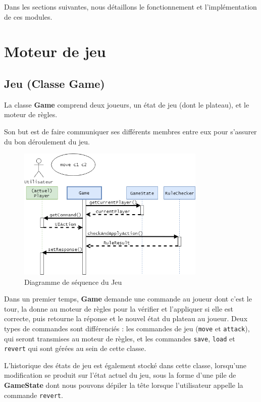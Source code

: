 \documentclass[a4paper]{report}
\begin{document}
Dans les sections suivantes, nous détaillons le fonctionnement et l'implémentation de ces modules.	

\section{Moteur de jeu}

\subsection{Jeu (Classe Game)}

La classe \textbf{Game} comprend deux joueurs, un état de jeu (dont le plateau), et le moteur de règles. 

Son but est de faire communiquer ses différents membres entre eux pour s'assurer du bon déroulement du jeu.

\begin{figure}[H]
\centering
\includegraphics[width=0.8\textwidth]{sequences/game.png}
\caption{Diagramme de séquence du Jeu}\label{seq:game}
\end{figure}

Dans un premier temps, \textbf{Game} demande une commande au joueur dont c'est le tour, la donne au moteur de règles pour la vérifier et l'appliquer si elle est correcte, puis retourne la réponse et le nouvel état du plateau au joueur. Deux types de commandes sont différenciés : les commandes de jeu (\texttt{move} et \texttt{attack}), qui seront transmises au moteur de règles, et les commandes \texttt{save}, \texttt{load} et \texttt{revert} qui sont gérées au sein de cette classe.

L'historique des états de jeu est également stocké dans cette classe, lorsqu'une modification se produit sur l'état actuel du jeu, sous la forme d'une pile de \textbf{GameState} dont nous pouvons dépiler la tête lorsque l'utilisateur appelle la commande {\tt revert}.
\end{document}
